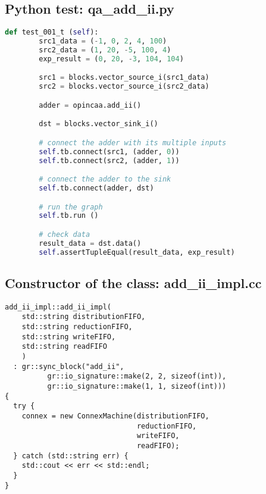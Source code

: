         \begin{minipage}{\linewidth}
        \subsection{Python test: qa\_add\_ii.py}
        \label{ssec:python-test}

                \begin{lstlisting}[language=Python]
def test_001_t (self):
        src1_data = (-1, 0, 2, 4, 100)
        src2_data = (1, 20, -5, 100, 4)
        exp_result = (0, 20, -3, 104, 104)

        src1 = blocks.vector_source_i(src1_data)
        src2 = blocks.vector_source_i(src2_data)

        adder = opincaa.add_ii()

        dst = blocks.vector_sink_i()

        # connect the adder with its multiple inputs
        self.tb.connect(src1, (adder, 0))
        self.tb.connect(src2, (adder, 1))

        # connect the adder to the sink
        self.tb.connect(adder, dst)

        # run the graph
        self.tb.run ()

        # check data
        result_data = dst.data()
        self.assertTupleEqual(result_data, exp_result)
                \end{lstlisting}
        \end{minipage}


        \begin{minipage}{\linewidth}
        \subsection{Constructor of the class: add\_ii\_impl.cc}
        \label{ssec:ctor}
                \begin{lstlisting}
add_ii_impl::add_ii_impl(
    std::string distributionFIFO,
    std::string reductionFIFO,
    std::string writeFIFO,
    std::string readFIFO
    )
  : gr::sync_block("add_ii",
          gr::io_signature::make(2, 2, sizeof(int)),
          gr::io_signature::make(1, 1, sizeof(int)))
{
  try {
    connex = new ConnexMachine(distributionFIFO,
                               reductionFIFO,
                               writeFIFO,
                               readFIFO);
  } catch (std::string err) {
    std::cout << err << std::endl;
  }
}
                \end{lstlisting}
                \end{minipage}

